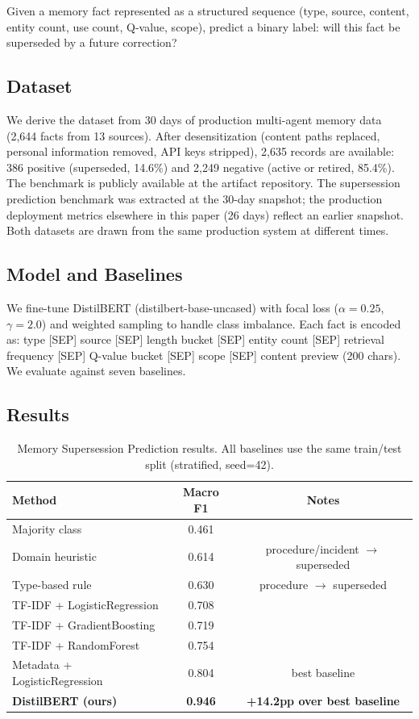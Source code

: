 \documentclass{article}
\begin{document}
Given a memory fact represented as a structured sequence (type, source, content, entity count, use count, Q-value, scope), predict a binary label: will this fact be superseded by a future correction?

\subsection{Dataset}

We derive the dataset from 30 days of production multi-agent memory data (2{,}644 facts from 13 sources). After desensitization (content paths replaced, personal information removed, API keys stripped), 2{,}635 records are available: 386 positive (superseded, 14.6\%) and 2{,}249 negative (active or retired, 85.4\%). The benchmark is publicly available at the artifact repository. The supersession prediction benchmark was extracted at the 30-day snapshot; the production deployment metrics elsewhere in this paper (26 days) reflect an earlier snapshot. Both datasets are drawn from the same production system at different times.

\subsection{Model and Baselines}

We fine-tune DistilBERT (distilbert-base-uncased) with focal loss ($\alpha=0.25$, $\gamma=2.0$) and weighted sampling to handle class imbalance. Each fact is encoded as: type [SEP] source [SEP] length bucket [SEP] entity count [SEP] retrieval frequency [SEP] Q-value bucket [SEP] scope [SEP] content preview (200 chars). We evaluate against seven baselines.

\subsection{Results}

\begin{table}[h]
\centering
\caption{Memory Supersession Prediction results. All baselines use the same train/test split (stratified, seed=42).}
\label{tab:supersession}
\begin{tabular}{lcc}
\toprule
Method & Macro F1 & Notes \\
\midrule
Majority class & 0.461 & \\
Domain heuristic & 0.614 & procedure/incident $\to$ superseded \\
Type-based rule & 0.630 & procedure $\to$ superseded \\
TF-IDF + LogisticRegression & 0.708 & \\
TF-IDF + GradientBoosting & 0.719 & \\
TF-IDF + RandomForest & 0.754 & \\
Metadata + LogisticRegression & 0.804 & best baseline \\
\midrule
\textbf{DistilBERT (ours)} & \textbf{0.946} & \textbf{+14.2pp over best baseline} \\
\bottomrule
\end{tabular}
\end{table}
\end{document}
